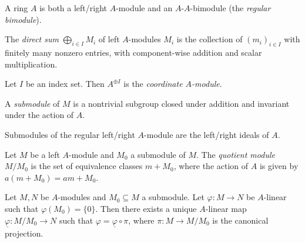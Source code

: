 \begin{example}
  A ring $A$ is both a left/right
  $A$-module and an $A$-$A$-bimodule
  (the \emph{regular bimodule}).
\end{example}

\begin{definition}
  The \emph{direct sum}
  $\bigoplus_{i \in I} M_i$ of
  left $A$-modules $M_i$ is the collection
  of $(m_i)_{i \in I}$ with finitely
  many nonzero entries, with
  component-wise addition and
  scalar multiplication.
\end{definition}

\begin{example}
  Let $I$ be an index set. Then
  $A^{\oplus I}$ is the
  \emph{coordinate $A$-module}.
\end{example}

\begin{definition}
  A \emph{submodule} of $M$ is a nontrivial
  subgroup closed under addition and invariant
  under the action of $A$.
\end{definition}

\begin{example}
  Submodules of the regular left/right
  $A$-module are the left/right ideals of $A$.
\end{example}

\begin{definition}
  Let $M$ be a left $A$-module and
  $M_0$ a submodule of $M$. The
  \emph{quotient module} $M / M_0$
  is the set of equivalence classes
  $m + M_0$, where the action of $A$ is
  given by $a(m + M_0) = am + M_0$.
\end{definition}

\begin{lemma}
  Let $M, N$ be $A$-modules and $M_0 \subseteq M$
  a submodule. Let
  $\varphi : M \to N$ be $A$-linear such that
  $\varphi(M_0) = \{0\}$. Then there exists a
  unique $A$-linear map $\underline{\varphi} : M / M_0 \to N$
  such that $\varphi = \underline{\varphi} \circ \pi$,
  where $\pi : M \to M / M_0$ is the
  canonical projection.
\end{lemma}
